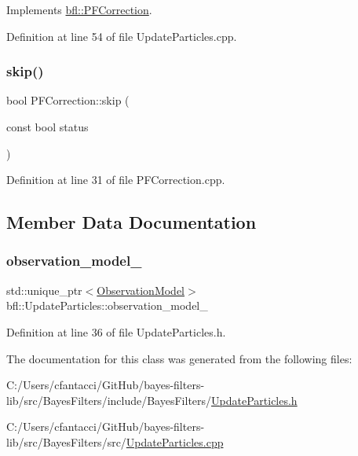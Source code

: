 Implements \mbox{\hyperlink{classbfl_1_1PFCorrection_a437fcf552a85f427d1369d8e43e56144}{bfl\+::\+P\+F\+Correction}}.



Definition at line 54 of file Update\+Particles.\+cpp.

\mbox{\label{classbfl_1_1PFCorrection_ab25e625ea12fe257e0eb85d465835e62}} 
\subsubsection{\texorpdfstring{skip()}{skip()}}
{\footnotesize\ttfamily bool P\+F\+Correction\+::skip (\begin{DoxyParamCaption}\item[{const bool}]{status }\end{DoxyParamCaption})\hspace{0.3cm}{\ttfamily [inherited]}}



Definition at line 31 of file P\+F\+Correction.\+cpp.



\subsection{Member Data Documentation}
\mbox{\label{classbfl_1_1UpdateParticles_a6414b89b3c7bf79d04c996512d63ae6c}} 
\subsubsection{\texorpdfstring{observation\+\_\+model\+\_\+}{observation\_model\_}}
{\footnotesize\ttfamily std\+::unique\+\_\+ptr$<$\mbox{\hyperlink{classbfl_1_1ObservationModel}{Observation\+Model}}$>$ bfl\+::\+Update\+Particles\+::observation\+\_\+model\+\_\+\hspace{0.3cm}{\ttfamily [protected]}}



Definition at line 36 of file Update\+Particles.\+h.



The documentation for this class was generated from the following files\+:\begin{DoxyCompactItemize}
\item 
C\+:/\+Users/cfantacci/\+Git\+Hub/bayes-\/filters-\/lib/src/\+Bayes\+Filters/include/\+Bayes\+Filters/\mbox{\hyperlink{UpdateParticles_8h}{Update\+Particles.\+h}}\item 
C\+:/\+Users/cfantacci/\+Git\+Hub/bayes-\/filters-\/lib/src/\+Bayes\+Filters/src/\mbox{\hyperlink{UpdateParticles_8cpp}{Update\+Particles.\+cpp}}\end{DoxyCompactItemize}
